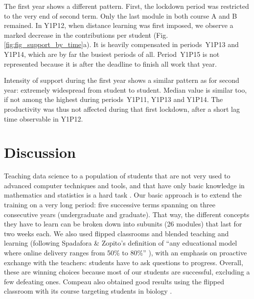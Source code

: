 \documentclass{aims}
\theoremstyle{definition}
\begin{document}
The first year shows a different pattern. First, the lockdown period was
restricted to the very end of second term. Only the last module in both
course A and B remained. In Y1P12, when distance learning was first
imposed, we observe a marked decrease in the contributions per student
(Fig. \ref {fig:fig_support_by_time}a). It is heavily compensated in
periods~Y1P13 and Y1P14, which are by far the busiest periods of all.
Period~Y1P15 is not represented because it is after the deadline to
finish all work that year.

Intensity of support during the first year shows a similar pattern as
for second year: extremely widespread from student to student. Median
value is similar too, if not among the highest during periods~Y1P11,
Y1P13 and Y1P14. The productivity was thus not affected during that
first lockdown, after a short lag time observable in Y1P12.

\hypertarget{discussion}{%
\section{Discussion}\label{discussion}}

Teaching data science to a population of students that are not very used
to advanced computer techniques and tools, and that have only basic
knowledge in mathematics and statistics is a hard task \cite{Sousa2018}.
Our basic approach is to extend the training on a very long period: five
successive terms spanning on three consecutive years (undergraduate and
graduate). That way, the different concepts they have to learn can be
broken down into subunits (26 modules) that last for two weeks each. We
also used flipped classrooms and blended teaching and learning
(following Spadafora \& Zopito's definition of ``any educational model
where online delivery ranges from 50\% to 80\%'' \cite{Spadafora2018}),
with an emphasis on proactive exchange with the teachers: students have
to ask questions to progress. Overall, these are winning choices because
most of our students are successful, excluding a few defeating ones.
Compeau also obtained good results using the flipped classroom with its
course targeting students in biology \cite{Compeau2019}.
\end{document}
